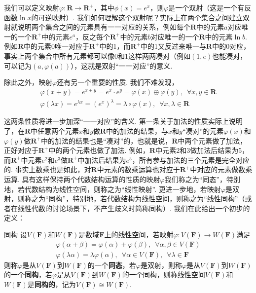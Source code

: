 我们可以定义映射$\varphi\colon\mathbf{R}\to\mathbf{R}^+$，其中$\phi(x)=e^x$，则$\varphi$是一个双射（这是一个有反函数$\ln x$的可逆映射）. 我们如何理解这个双射呢？实际上在两个集合之间建立双射就说明两个集合之间的元素具有一一对应的关系，例如每个$\mathbf{R}$中的元素$a$对应唯一的一个$\mathbf{R}^+$中的元素$e^a$，反之每个$\mathbf{R}^+$中的元素$b$对应唯一的一个$\mathbf{R}$中的元素$\ln b$. 例如$\mathbf{R}$中的元素$0$唯一对应于$\mathbf{R}^+$中的1，而$\mathbf{R}^+$中的1又反过来唯一与$\mathbf{R}$中的$0$对应，事实上两个集合中所有元素都可以像$0$和$1$这样两两凑对（例如$(1,e)$也能凑对，可以记为$(a,\varphi(a))$），这就是双射``一一对应''的意义.

除此之外，映射$\varphi$还有另一个重要的性质. 我们不难发现，
\begin{gather*}
    \varphi(x+y)=e^{x+y}=e^x\cdot e^y=\varphi(x)\oplus\varphi(y),\enspace\forall x,y\in\mathbf{R} \\
    \varphi(\lambda x)=e^{\lambda x}=(e^x)^\lambda=\lambda\circ\varphi(x),\enspace\forall x,\lambda\in\mathbf{R}
\end{gather*}

这两条性质将进一步加深``一一对应''的含义. 第一条关于加法的性质实际上说明了，在$\mathbf{R}$中任意两个元素$x$和$y$做$\mathbf{R}$中的加法的结果，与$x$和$y$``凑对''的元素$\varphi(x)$和$\varphi(y)$做$\mathbf{R}^+$中的加法的结果也是``凑对''的，也就是说，$\mathbf{R}$中两个元素做了加法，正好对应于$\mathbf{R}^+$中的两个元素也做了加法. 例如，$\mathbf{R}$中元素$2$和$3$做加法后结果为$5$，而$\mathbf{R}^+$中元素$e^2$和$e^3$做$\mathbf{R}^+$中加法后结果为$e^5$，所有参与加法的三个元素是完全对应的. 事实上数乘也是如此，对$\mathbf{R}$中元素的数乘运算也对应于$\mathbf{R}^+$中对应的元素做数乘运算. 具有这样保持两个代数结构运算的性质的映射$\varphi$我们称之为``同态''，特别地，若代数结构为线性空间，则称之为``线性映射''. 更进一步地，若映射$\varphi$是双射，则称之为``同构''，特别地，若代数结构为线性空间，则称之为``线性同构''（或者在线性代数的讨论场景下，不产生歧义时简称同构）. 我们在此给出一个初步的定义：
\begin{definition}{}{同构}
    设$V(\mathbf{F})$和$W(\mathbf{F})$是数域$\mathbf{F}$上的线性空间，若映射$\varphi\colon V(\mathbf{F})\to W(\mathbf{F})$满足
    \begin{gather*}
        \varphi(\alpha+\beta)=\varphi(\alpha)+\varphi(\beta),\enspace\forall\alpha,\beta\in V(\mathbf{F}) \\
        \varphi(\lambda\alpha)=\lambda\varphi(\alpha),\enspace\forall\alpha\in V(\mathbf{F}),\enspace\forall\lambda\in\mathbf{F}
    \end{gather*}
    则称$\varphi$是从$V(\mathbf{F})$到$W(\mathbf{F})$的一个\textbf{同态}，若$\varphi$是双射，则称$\varphi$是从$V(\mathbf{F})$到$W(\mathbf{F})$的一个\textbf{同构}，若$\varphi$是从$V(\mathbf{F})$到$W(\mathbf{F})$的一个同构，则称线性空间$V(\mathbf{F})$和$W(\mathbf{F})$是\textbf{同构的}，记为$V(\mathbf{F})\cong W(\mathbf{F})$.
\end{definition}

